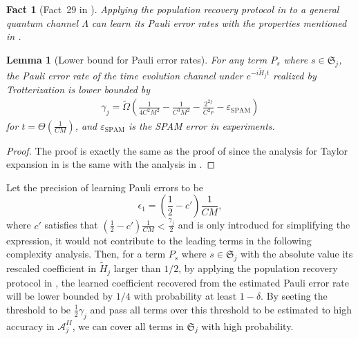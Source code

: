 \documentclass[twocolumn,superscriptaddress,aps,showpacs,amsmath,amstex,amssymb,citeautoscript,floatfix,pra,preprintnumbers]{revtex4-2}
\newtheorem{lemma}[theorem]{Lemma}
\theoremstyle{plain}
\theoremstyle{plain}
\theoremstyle{plain}
\theoremstyle{plain}
\theoremstyle{plain}
\theoremstyle{plain}
\newtheorem{fact}[thm]{Fact}
\begin{document}
\begin{appendix}
\begin{fact}[Fact~29 in \cite{Flammia2021paulierror}]
    Applying the population recovery protocol in \cite{Flammia2021paulierror} to a general quantum channel $\Lambda$ can learn its Pauli error rates with the properties mentioned in .
\end{fact}

\begin{lemma}[Lower bound for Pauli error rates]
    For any term $P_s$ where $s\in\mathfrak{S}_j$, the Pauli error rate of the time evolution channel under $e^{-i\tilde{H}_jt}$ realized by Trotterization is lower bounded by
    \begin{eqnarray}
        \gamma_j = \widetilde{\Omega}\left(\frac{1}{4C^2M^2}-\frac{1}{C^3M^2}-\frac{2^{2j}}{C^2r}-\varepsilon_{\text{SPAM}}\right)
    \end{eqnarray}
    for $t = \Theta(\frac{1}{CM})$, and $\varepsilon_{\text{SPAM}}$ is the SPAM error in experiments. 
\end{lemma}
\begin{proof}
    The proof is exactly the same as the proof of  since the analysis for Taylor expansion in  is the same with the analysis in .
\end{proof}

Let the precision of learning Pauli errors to be 
\begin{equation}
    \epsilon_1 = (\frac{1}{2}-c')\frac{1}{CM},
\end{equation}
where $c'$ satisfies that $(\frac{1}{2}-c')\frac{1}{CM} < \frac{\gamma_j}{2}$ and is only introducd for simplifying the expression, it would not contribute to the leading terms in the following complexity analysis. Then, for a term $P_s$ where $s\in\mathfrak{S}_j$ with the absolute value its rescaled coefficient in $\tilde{H}_j$ larger than $1/2$, by applying the population recovery protocol in , the learned coefficient recovered from the estimated Pauli error rate will be lower bounded by $1/4$ with probability at least $1-\delta$. By seeting the threshold to be $\frac{1}{2}\gamma_j$ and pass all terms over this threshold to be estimated to high accuracy in $\mathcal{A}^{II}_j$, we can cover all terms in $\mathfrak{S}_j$ with high probability.


\end{appendix}
\end{document}
